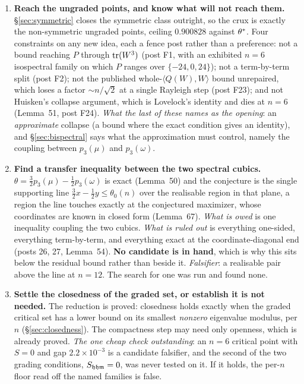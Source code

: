 \begin{enumerate}[leftmargin=1.8em]
\item \textbf{Reach the ungraded points, and know what will not reach them.} \S\ref{sec:symmetric} closes the symmetric class outright, so the crux is exactly the non-symmetric ungraded points, ceiling $0.900828$ against $\theta^{*}$. Four constraints on any new idea, each a fence post rather than a preference: not a bound reaching $P$ through $\operatorname{tr}(W^3)$ (post F1, with an exhibited $n=6$ isospectral family on which $P$ ranges over $\{-24,0,24\}$); not a term-by-term split (post F2); not the published whole-$\langle Q(W),W\rangle$ bound unrepaired, which loses a factor $\sim n/\sqrt2$ at a single Rayleigh step (post F23); and not Huisken's collapse argument, which is Lovelock's identity and dies at $n=6$ (Lemma~51, post F24). \emph{What the last of these names as the opening}: an \emph{approximate} collapse (a bound where the exact condition gives an identity), and \S\ref{sec:bispectral} says what the approximation must control, namely the coupling between $p_3(\mu)$ and $p_3(\omega)$.

\item \textbf{Find a transfer inequality between the two spectral cubics.} $\theta=\tfrac32p_3(\mu)-\tfrac12p_3(\omega)$ is exact (Lemma~50) and the conjecture is the single supporting line $\tfrac32x-\tfrac12y\le\theta_0(n)$ over the realisable region in that plane, a region the line touches exactly at the conjectured maximizer, whose coordinates are known in closed form (Lemma~67). \emph{What is owed} is one inequality coupling the two cubics. \emph{What is ruled out} is everything one-sided, everything term-by-term, and everything exact at the coordinate-diagonal end (posts 26, 27, Lemma~54). \textbf{No candidate is in hand}, which is why this sits below the residual bound rather than beside it. \emph{Falsifier}: a realisable pair above the line at $n=12$. The search for one was run and found none.

\item \textbf{Settle the closedness of the graded set, or establish it is not needed.} The reduction is proved: closedness holds exactly when the graded critical set has a lower bound on its smallest \emph{nonzero} eigenvalue modulus, per $n$ (\S\ref{sec:closedness}). The compactness step may need only openness, which is already proved. \emph{The one cheap check outstanding}: an $n=6$ critical point with $S=0$ and gap $2.2\times10^{-3}$ is a candidate falsifier, and the second of the two grading conditions, $S_{\mathfrak{h}\mathfrak{h}\mathfrak{m}}=0$, was never tested on it. If it holds, the per-$n$ floor read off the named families is false.


\end{enumerate}
